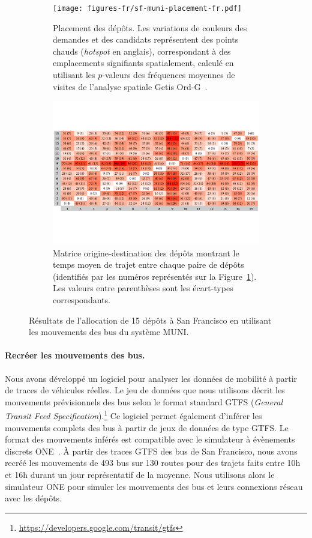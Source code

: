  
\begin{figure}[t!] 
    \begin{subfigure}[t]{0.4\textwidth} 
        \centering 
        \texttt{[image: figures-fr/sf-muni-placement-fr.pdf]} 
        \caption{Placement des dépôts. Les variations de couleurs des demandes et des candidats représentent des points chauds (\textit{hotspot} en anglais), correspondant à des emplacements signifiants spatialement, calculé en utilisant les $p$-valeurs des fréquences moyennes de visites de l’analyse spatiale Getis Ord-G~\cite{getis1992analysis}.} 
        \label{fig:sf-muni-placement-fr} 
    \end{subfigure} 
    \qquad 
    \begin{subfigure}[t]{0.55\textwidth} 
        \centering 
        \includegraphics[width=.9\linewidth]{figures-fr/origin-destination-matrix-fr.pdf} 
        \caption{Matrice origine-destination des dépôts montrant le temps moyen de trajet entre chaque paire de dépôts (identifiés par les numéros représentés sur la Figure~\ref{fig:sf-muni-placement-fr}). Les valeurs entre parenthèses sont les écart-types correspondants. } 
        \label{fig:propagation-times-matrix-fr} 
    \end{subfigure} 
    \caption{Résultats de l’allocation de 15 dépôts à San Francisco en utilisant les mouvements des bus du système MUNI.} 
\end{figure} 
 
 
\paragraph{Recréer les mouvements des bus.} 
Nous avons développé un logiciel pour analyser les données de mobilité à partir de traces de véhicules réelles. Le jeu de données que nous utilisons décrit les mouvements prévisionnels des bus selon le format standard GTFS (\textit{General Transit Feed Specification}).\footnote{\url{https://developers.google.com/transit/gtfs}} Ce logiciel permet également d’inférer les mouvements complets des bus à partir de jeux de données de type GTFS. Le format des mouvements inférés est compatible avec le simulateur à évènements discrets ONE~\cite{keranen2009one}. À partir des traces GTFS des bus de San Francisco, nous avons recréé les mouvements de 493 bus sur 130 routes pour des trajets faits entre 10h et 16h durant un jour représentatif de la moyenne. Nous utilisons alors le simulateur ONE pour simuler les mouvements des bus et leurs connexions réseau avec les dépôts. 
 
